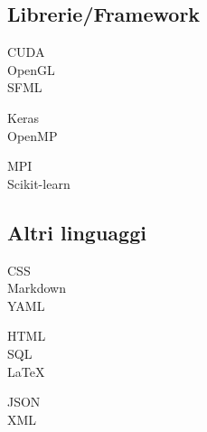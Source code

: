 \documentclass[curriculum-vitae-ita]{subfiles}
\begin{document}
		\subsection*{Librerie/Framework}
			\begin{minipage}[t]{.3\textwidth}
				CUDA \hfill {}\\
				OpenGL \hfill {}\\
				SFML \hfill {}\\
			\end{minipage}
			\hfill
			\begin{minipage}[t]{.3\textwidth}
				Keras \hfill {}\\
				OpenMP \hfill {}\\
			\end{minipage}
			\hfill
			\begin{minipage}[t]{.3\textwidth}
				MPI \hfill {}\\
				Scikit-learn \hfill {}\\
			\end{minipage}
		
		\subsection*{Altri linguaggi}
			\begin{minipage}[t]{.3\textwidth}
				CSS \hfill {}\\
				Markdown \hfill {}\\
				YAML \hfill {}\\
			\end{minipage}
			\hfill
			\begin{minipage}[t]{.3\textwidth}
				HTML \hfill {}\\
				SQL \hfill {}\\
				\LaTeX \hfill {}\\
			\end{minipage}
			\hfill
			\begin{minipage}[t]{.3\textwidth}
				JSON \hfill {}\\
				XML \hfill {}\\
			\end{minipage}
		
\end{document}
